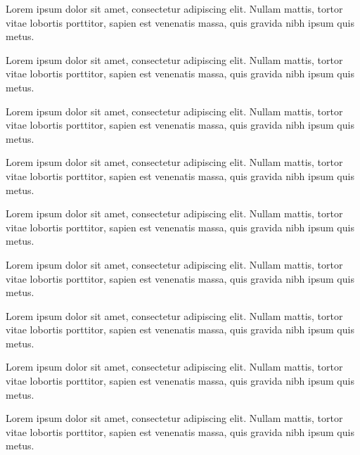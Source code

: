 \documentclass[twoside,a4paper]{article}
\begin{document}
{Lorem ipsum dolor sit amet, consectetur adipiscing elit. Nullam mattis, tortor vitae lobortis porttitor, sapien est venenatis massa, quis gravida nibh ipsum quis metus. 

Lorem ipsum dolor sit amet, consectetur adipiscing elit. Nullam mattis, tortor vitae lobortis porttitor, sapien est venenatis massa, quis gravida nibh ipsum quis metus. 

Lorem ipsum dolor sit amet, consectetur adipiscing elit. Nullam mattis, tortor vitae lobortis porttitor, sapien est venenatis massa, quis gravida nibh ipsum quis metus. 

Lorem ipsum dolor sit amet, consectetur adipiscing elit. Nullam mattis, tortor vitae lobortis porttitor, sapien est venenatis massa, quis gravida nibh ipsum quis metus. 

Lorem ipsum dolor sit amet, consectetur adipiscing elit. Nullam mattis, tortor vitae lobortis porttitor, sapien est venenatis massa, quis gravida nibh ipsum quis metus. 


Lorem ipsum dolor sit amet, consectetur adipiscing elit. Nullam mattis, tortor vitae lobortis porttitor, sapien est venenatis massa, quis gravida nibh ipsum quis metus. 

Lorem ipsum dolor sit amet, consectetur adipiscing elit. Nullam mattis, tortor vitae lobortis porttitor, sapien est venenatis massa, quis gravida nibh ipsum quis metus. 

Lorem ipsum dolor sit amet, consectetur adipiscing elit. Nullam mattis, tortor vitae lobortis porttitor, sapien est venenatis massa, quis gravida nibh ipsum quis metus. 

Lorem ipsum dolor sit amet, consectetur adipiscing elit. Nullam mattis, tortor vitae lobortis porttitor, sapien est venenatis massa, quis gravida nibh ipsum quis metus.}
\end{document}
